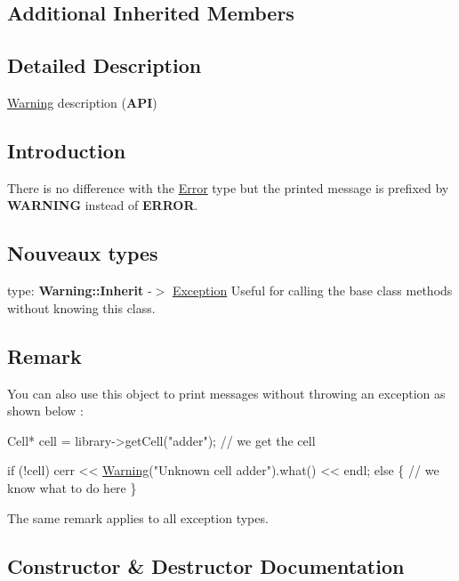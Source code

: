 \subsection*{Additional Inherited Members}


\subsection{Detailed Description}
\hyperlink{classHurricane_1_1Warning}{Warning} description ({\bfseries A\+PI}) 

\hypertarget{classHurricane_1_1Warning_secWarningIntro}{}\subsection{Introduction}\label{classHurricane_1_1Warning_secWarningIntro}
There is no difference with the \hyperlink{classHurricane_1_1Error}{Error} type but the printed message is prefixed by {\bfseries W\+A\+R\+N\+I\+NG} instead of {\bfseries E\+R\+R\+OR}.\hypertarget{classHurricane_1_1Warning_secWarningNouveauxTypes}{}\subsection{Nouveaux types}\label{classHurricane_1_1Warning_secWarningNouveauxTypes}
type\+: {\bfseries Warning\+::\+Inherit} -\/$>$ \hyperlink{classHurricane_1_1Exception}{Exception} Useful for calling the base class methods without knowing this class.\hypertarget{classHurricane_1_1Warning_secWarningRemark}{}\subsection{Remark}\label{classHurricane_1_1Warning_secWarningRemark}
You can also use this object to print messages without throwing an exception as shown below \+: 
\begin{DoxyCode}
Cell* cell = library->getCell(\textcolor{stringliteral}{"adder"}); \textcolor{comment}{// we get the cell}
 
\textcolor{keywordflow}{if} (!cell)
   cerr << \hyperlink{classHurricane_1_1Warning_aea7aa9bccac13e6c15b1eb3b4741ef0d}{Warning}(\textcolor{stringliteral}{"Unknown cell adder"}).what() << endl;
\textcolor{keywordflow}{else} \{
   \textcolor{comment}{// we know what to do here}
\}
\end{DoxyCode}
 The same remark applies to all exception types. 

\subsection{Constructor \& Destructor Documentation}
\mbox{\label{classHurricane_1_1Warning_aea7aa9bccac13e6c15b1eb3b4741ef0d}} 
